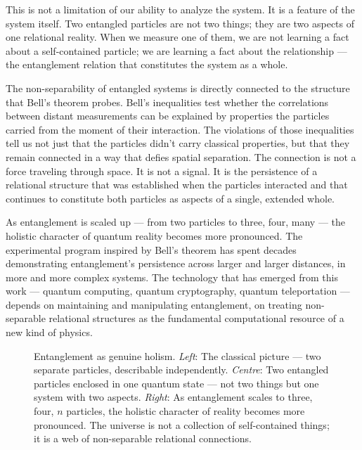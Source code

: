 This is not a limitation of our ability to analyze the system. It is a feature of the system itself. Two entangled particles are not two things; they are two aspects of one relational reality. When we measure one of them, we are not learning a fact about a self-contained particle; we are learning a fact about the relationship --- the entanglement relation that constitutes the system as a whole.

The non-separability of entangled systems is directly connected to the structure that Bell's theorem probes. Bell's inequalities test whether the correlations between distant measurements can be explained by properties the particles carried from the moment of their interaction. The violations of those inequalities tell us not just that the particles didn't carry classical properties, but that they remain connected in a way that defies spatial separation. The connection is not a force traveling through space. It is not a signal. It is the persistence of a relational structure that was established when the particles interacted and that continues to constitute both particles as aspects of a single, extended whole.

As entanglement is scaled up --- from two particles to three, four, many --- the holistic character of quantum reality becomes more pronounced. The experimental program inspired by Bell's theorem has spent decades demonstrating entanglement's persistence across larger and larger distances, in more and more complex systems. The technology that has emerged from this work --- quantum computing, quantum cryptography, quantum teleportation --- depends on maintaining and manipulating entanglement, on treating non-separable relational structures as the fundamental computational resource of a new kind of physics.

\begin{figure}[htbp]
  \centering
  \resizebox{\linewidth}{!}{}
  \caption[Non-separability: two particles, one system]{Entanglement as genuine holism. \emph{Left}: The classical picture --- two separate particles, describable independently. \emph{Centre}: Two entangled particles enclosed in one quantum state --- not two things but one system with two aspects. \emph{Right}: As entanglement scales to three, four, $n$ particles, the holistic character of reality becomes more pronounced. The universe is not a collection of self-contained things; it is a web of non-separable relational connections.}
  \label{fig:entanglement-web}
\end{figure}

